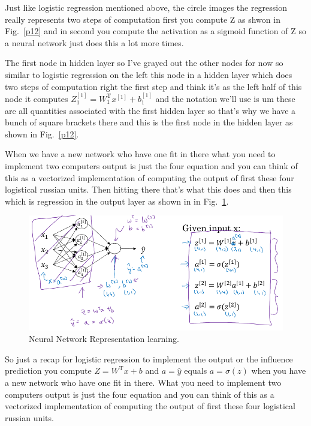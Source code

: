 \documentclass[a4paper]{article}
\begin{document}
Just like logistic regression mentioned above, the circle images the regression really represents two steps of computation first you compute Z as  shwon in Fig.~\ref{p12} and in second you compute the activation as a sigmoid function of Z so a neural network just does this a lot more times. 
 
The first node in hidden layer so I've grayed out the other nodes for now so similar to logistic regression on the left this node in a hidden layer which  does two steps of computation right the first step and think it's as the left half of this node it computes $Z^{[1]}_1=W_1^\mathrm{T}x^{[1]}+b_1^{[1]}$ and the notation we'll use is um these are all quantities associated with the first hidden layer so that's why we have a bunch of square brackets there and this is the first node in the hidden layer as shown in Fig.~\ref{p12}.

When we have a new network who have one fit in there what you need to implement two computers output is just the four equation and you can think of this as a vectorized implementation of computing the output of first these four logistical russian units. Then hitting there that's what this does and then this which is regression in the output layer as shown in in Fig.~\ref{p13}.
 \begin{figure}
 	\begin{center}
 		\includegraphics[scale=0.4]{figures/15.png}
 	\end{center}
 	\caption{Neural Network Representation learning.}
 	\label{p13}
 \end{figure}

So just a recap for logistic regression to implement the output or the influence prediction you compute $Z=W^\mathrm{T}x+b$ and $a=\hat{y}$ equals $a=\sigma(z)$ when you have a new network who have one fit in there. What you need to implement two computers output is just the four equation and you can think of this as a vectorized implementation of computing the output of first these four logistical russian units.
\end{document}
